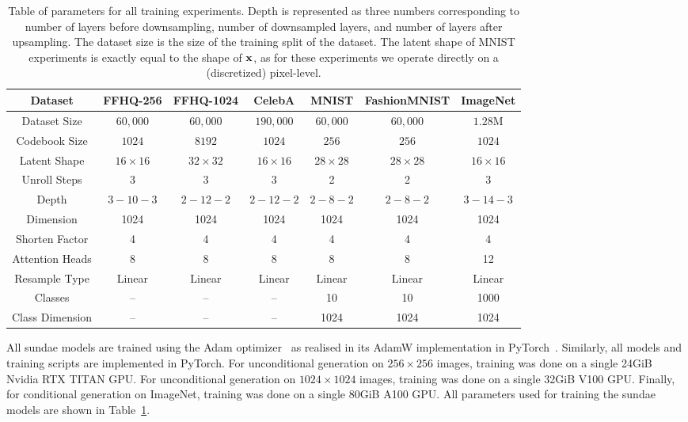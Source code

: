 \begin{table}[ht]
    \centering
    \begin{tabular}{|c||c c||c||c c||c||}
    \hline
    \textbf{Dataset} & \textbf{FFHQ-256} & \textbf{FFHQ-1024} & \textbf{CelebA}
                     & \textbf{MNIST} & \textbf{FashionMNIST} &
                     \textbf{ImageNet} \\
    \hline
    Dataset Size & $60,000$ & $60,000$ & $190,000$ & $60,000$ & $60,000$ & $1.28$M \\
    Codebook Size & $1024$ & $8192$ & $1024$ & $256$ & $256$ & $1024$ \\
    Latent Shape & $16 \times 16$ & $32 \times 32$ & $16 \times 16$ & $28 \times
                 28$ & $28 \times 28$ & $16 \times 16$ \\
    Unroll Steps & 3 & 3 & 3 & 2 & 2 & 3 \\
    \hline
    Depth & $3-10-3$ & $2-12-2$ & $2-12-2$ & $2-8-2$ & $2-8-2$ & $3-14-3$\\
    Dimension & 1024 & 1024 & 1024 & 1024 & 1024 & 1024 \\
    Shorten Factor & 4 & 4 & 4 & 4 & 4 & 4 \\
    Attention Heads & 8 & 8 & 8 & 8 & 8 & 12 \\
    Resample Type & Linear & Linear & Linear & Linear & Linear & Linear \\
    \hline
    Classes & -- & -- & -- & 10 & 10 & 1000 \\
    Class Dimension & -- & -- & -- & 1024 & 1024 & 1024 \\
    \hline
    \end{tabular}
    \caption{
        Table of parameters for all training experiments. Depth is
        represented as three numbers corresponding to number of layers before
        downsampling, number of downsampled layers, and number of layers after
        upsampling. The dataset size is the size of the training split of the
        dataset. The latent shape of MNIST experiments is exactly equal to the
        shape of $\mathbf{x}$, as for these experiments we operate directly on a
        (discretized) pixel-level.
    }
    \label{tab:parameters}
\end{table}

All \gls{sundae} models are trained using the Adam optimizer~\cite{kingma2014adam} as
realised in its AdamW implementation in PyTorch~\cite{paszke2019pytorch}.
Similarly, all models and training scripts are implemented in PyTorch. For
unconditional generation on $256 \times 256$ images, training was done on a
single 24GiB Nvidia RTX TITAN GPU. For unconditional generation on $1024 \times
1024$ images, training was done on a single 32GiB V100 GPU. Finally, for
conditional generation on ImageNet, training was done on a single 80GiB A100
GPU. All parameters used for training the \gls{sundae} models are shown in
Table~\ref{tab:parameters}.

